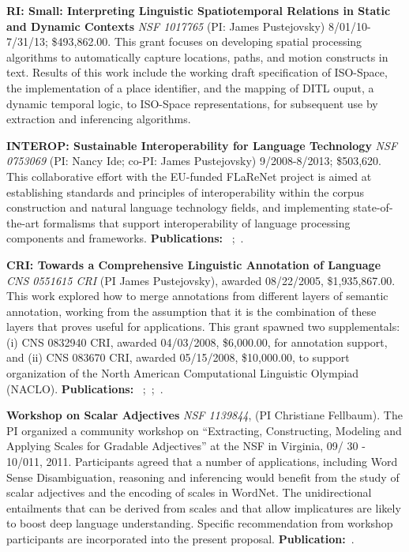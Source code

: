 \documentclass[10pt]{article}
\newcommand{\miniskip}{\vspace*{1mm}}
\begin{document}
\noindent
 {\bf 
RI: Small: Interpreting Linguistic Spatiotemporal Relations in Static and Dynamic Contexts}
{\it NSF 1017765} (PI: James Pustejovsky)  8/01/10-7/31/13; 
\$493,862.00. This grant focuses on developing spatial processing algorithms  to automatically capture locations, paths, and motion constructs in text.  Results of this work include the working draft specification of ISO-Space, the implementation of a place identifier, and the mapping of DITL ouput, a dynamic temporal logic, to ISO-Space representations, for subsequent use by extraction and inferencing algorithms. 

\noindent
{\bf INTEROP: Sustainable Interoperability for Language Technology} 
{\it NSF 0753069} (PI: Nancy Ide; co-PI: James Pustejovsky) 9/2008-8/2013; \$503,620.
This collaborative effort with the EU-funded FLaReNet project is aimed at establishing standards and principles of interoperability within the corpus construction and natural language technology fields, and implementing state-of-the-art formalisms that support interoperability of language processing components and frameworks.  {\bf Publications: }~\cite{idesuderman09};~\cite{ide-bunt:2010:LAW-IV}.

\noindent
{\bf CRI: Towards a Comprehensive Linguistic Annotation of Language} {\it CNS 0551615 CRI} (PI James Pustejovsky), awarded 08/22/2005, \$1,935,867.00. This work explored how to merge annotations from different layers of semantic annotation, working from the assumption that it is the combination of these layers that proves useful for applications. This grant spawned two supplementals: (i) CNS 0832940 CRI, awarded 04/03/2008, \$6,000.00, for annotation support, and (ii) CNS 083670 CRI, awarded 05/15/2008, \$10,000.00, to support organization of the North American Computational Linguistic Olympiad (NACLO). {\bf Publications: }~\cite{verhagen-stubbs-pustejovsky:2007:LAW};~\cite{verhagen-EtAl:2007:SemEval-2007};~\cite{verhagen-pustejovsky:2007:Interoperability}.

\noindent
{\bf Workshop on Scalar Adjectives}
{\it  NSF   1139844}, (PI Christiane Fellbaum).  The PI organized a community workshop on ``Extracting, Constructing, 
Modeling and Applying Scales for Gradable Adjectives'' at the NSF in Virginia, 09/ 30 - 10/011, 2011. Participants agreed that a number of applications, including  
Word Sense Disambiguation,  reasoning and inferencing would benefit 
from the study of scalar adjectives and the encoding of scales in WordNet. The
unidirectional entailments that can be derived from scales and that allow implicatures are
likely to boost deep language understanding. Specific recommendation from workshop participants 
are incorporated into the present proposal. {\bf Publication:}~\cite{sheinmanetal2013}.
\end{document}
